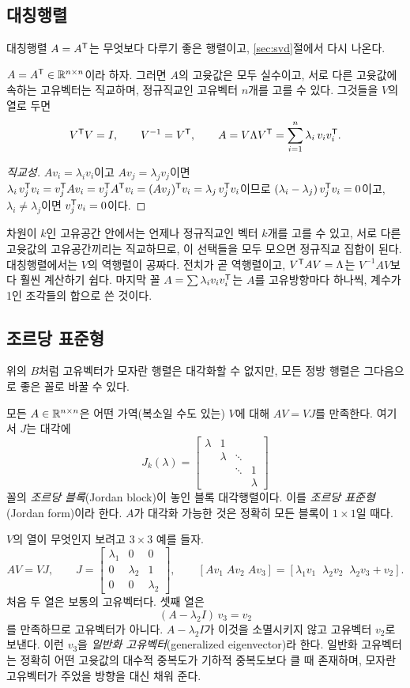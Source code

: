 \documentclass[11pt]{article}
\begin{document}
\subsection{대칭행렬}\label{sec:symmetric}
대칭행렬 $A=A^{\mathsf{T}}$는 무엇보다 다루기 좋은 행렬이고, \ref{sec:svd}절에서 다시 나온다.
\begin{theorem}[스펙트럼 정리]\label{thm:spectral}
$A=A^{\mathsf{T}}\in\mathbb{R}^{n\times n}$이라 하자. 그러면 $A$의 고윳값은 모두 실수이고, 서로 다른
고윳값에 속하는 고유벡터는 직교하며, 정규직교인 고유벡터 $n$개를 고를 수 있다. 그것들을
$V$의 열로 두면
\[
   V^{\mathsf{T}} V=I,\qquad V^{-1}=V^{\mathsf{T}},\qquad
   A = V\Lambda V^{\mathsf{T}} = \sum_{i=1}^{n}\lambda_i\,v_iv_i^{\mathsf{T}} .
\]
\end{theorem}
\begin{proof}[직교성]
$Av_i=\lambda_iv_i$이고 $Av_j=\lambda_jv_j$이면
$\lambda_i\,v_j^{\mathsf{T}} v_i = v_j^{\mathsf{T}} Av_i = v_j^{\mathsf{T}} A^{\mathsf{T}} v_i = (Av_j)^{\mathsf{T}} v_i
= \lambda_j\,v_j^{\mathsf{T}} v_i$이므로 $(\lambda_i-\lambda_j)\,v_j^{\mathsf{T}} v_i=0$이고,
$\lambda_i\neq\lambda_j$이면 $v_j^{\mathsf{T}} v_i=0$이다.
\end{proof}
차원이 $k$인 고유공간 안에서는 언제나 정규직교인 벡터 $k$개를 고를 수 있고, 서로 다른
고윳값의 고유공간끼리는 직교하므로, 이 선택들을 모두 모으면 정규직교 집합이 된다.
대칭행렬에서는 $V$의 역행렬이 공짜다. 전치가 곧 역행렬이고, $V^{\mathsf{T}} AV=\Lambda$는
$V^{-1}AV$보다 훨씬 계산하기 쉽다. 마지막 꼴 $A=\sum\lambda_iv_iv_i^{\mathsf{T}}$는 $A$를
고유방향마다 하나씩, 계수가 1인 조각들의 합으로 쓴 것이다.

\subsection{조르당 표준형}\label{sec:jordan}
위의 $B$처럼 고유벡터가 모자란 행렬은 대각화할 수 없지만, 모든 정방 행렬은 그다음으로
좋은 꼴로 바꿀 수 있다.
\begin{theorem}
모든 $A\in\mathbb{R}^{n\times n}$은 어떤 가역(복소일 수도 있는) $V$에 대해 $AV=VJ$를
만족한다. 여기서 $J$는 대각에
\[
   J_k(\lambda)=\begin{bmatrix}\lambda&1&&\\&\lambda&\ddots&\\&&\ddots&1\\&&&\lambda\end{bmatrix}
\]
꼴의 \emph{조르당 블록}(Jordan block)이 놓인 블록 대각행렬이다. 이를 \emph{조르당
표준형}(Jordan form)이라 한다. $A$가 대각화 가능한 것은 정확히 모든 블록이 $1\times1$일
때다.
\end{theorem}
$V$의 열이 무엇인지 보려고 $3\times3$ 예를 들자.
\[
   AV=VJ,\qquad J=\begin{bmatrix}\lambda_1&0&0\\0&\lambda_2&1\\0&0&\lambda_2\end{bmatrix},
   \qquad
   [Av_1\;Av_2\;Av_3]=[\lambda_1v_1\;\;\lambda_2v_2\;\;\lambda_2v_3+v_2].
\]
처음 두 열은 보통의 고유벡터다. 셋째 열은
\[
   (A-\lambda_2I)\,v_3 = v_2
\]
를 만족하므로 고유벡터가 아니다. $A-\lambda_2I$가 이것을 소멸시키지 않고 고유벡터
$v_2$로 보낸다. 이런 $v_3$을 \emph{일반화 고유벡터}(generalized eigenvector)라 한다.
일반화 고유벡터는 정확히 어떤 고윳값의 대수적 중복도가 기하적 중복도보다 클 때
존재하며, 모자란 고유벡터가 주었을 방향을 대신 채워 준다.
\end{document}
